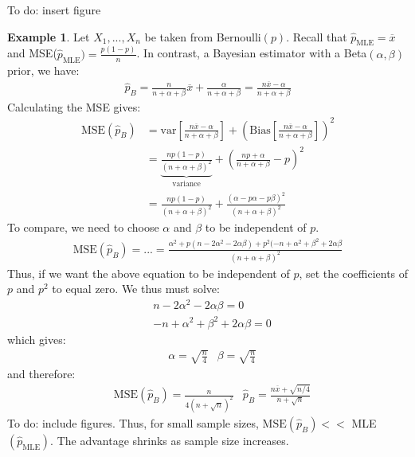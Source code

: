 \documentclass[11pt]{scrartcl}
\theoremstyle{definition}
\newtheorem{ex}{Example}
\theoremstyle{remark}
\begin{document}
{To do: insert figure

\begin{ex}
	Let $X_1, ..., X_n$ be taken from Bernoulli$(p)$. Recall that $\hat{p}_{\text{MLE}} = \overline{x}$ and MSE($\hat{p}_{\text{MLE}}) = \frac{p(1-p)}{n}$. In contrast, a Bayesian estimator with a Beta$(\alpha, \beta)$ prior, we have: 
	\begin{align*}
		\hat{p}_B = \frac{n}{n + \alpha + \beta} \overline{x} + \frac{\alpha}{n+ \alpha + \beta}	 = \frac{n \overline{x} - \alpha}{n + \alpha + \beta}	
	\end{align*}
	Calculating the MSE gives: 
	\begin{align*}
		\text{MSE}(\hat{p}_B) & = \text{var} \left[ 	\frac{n \overline{x} - \alpha}{n + \alpha + \beta}		\right] + \left( \text{Bias} \left[ \frac{n \overline{x} - \alpha}{n + \alpha + \beta}	 \right]  \right)^2 \\
		& = \underbrace{\frac{np(1-p)}{(n+ \alpha + \beta)^2}}_{\text{variance}} + \left( 	\frac{np + \alpha}{n + \alpha + \beta} - p	\right)^2 \\
		& = \frac{np(1-p)}{(n + \alpha + \beta)^2} + \frac{(\alpha - p \alpha - p \beta)^2}{(n + \alpha + \beta)^2}
	\end{align*}
	To compare, we need to choose $\alpha$ and $\beta$ to be independent of $p$. 
	\begin{align*}
		\text{MSE}(\hat{p}_B) = ... = \frac{\alpha^ 2 + p(n - 2 \alpha^2 - 2 \alpha \beta) + p^2(-n + \alpha^2 + \beta^2 + 2 \alpha \beta}{(n+ \alpha + \beta)^2}
	\end{align*}
	Thus, if we want the above equation to be independent of $p$, set the coefficients of $p$ and $p^2$ to equal zero. We thus must solve: 
	\begin{align*}
			& n - 2 \alpha^2 - 2 \alpha \beta = 0 \\
			& -n + \alpha^2 + \beta^2 + 2 \alpha \beta = 0
	\end{align*}
	which gives: 
	\begin{align*}
		& \alpha = \sqrt{\frac{n}{4}} & \beta = \sqrt{\frac{n}{4}}
	\end{align*}
	and therefore: 
	\begin{align*}
		& \text{MSE}(\hat{p}_B) = \frac{n}{4(n+ \sqrt{n})^2 }	& \hat{p}_B = \frac{n \overline{x} + \sqrt{n / 4}}{n + \sqrt{n}}
	\end{align*}
	To do: include figures. 
	Thus, for small sample sizes, $\text{MSE}(\hat{p}_B )<< $ MLE$(\hat{p}_{\text{MLE}})$. The advantage shrinks as sample size increases. 
\end{ex}

}
\end{document}
